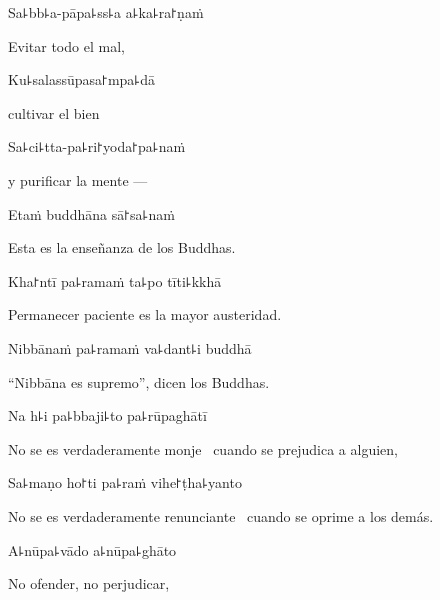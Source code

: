 
\enlargethispage{\baselineskip}

\begin{leader}
\end{leader}

Sa꜕bb꜕a-pāpa꜕ss꜕a a꜕ka꜕ra꜓ṇaṁ
	
	\begin{english}
		Evitar todo el mal,
	\end{english}
	
	Ku꜕salassūpasa꜓mpa꜕dā
	
	\begin{english}
		cultivar el bien
	\end{english}
	
	Sa꜕ci꜕tta-pa꜕ri꜓yoda꜓pa꜕naṁ
	
	\begin{english}
		y purificar la mente ---
	\end{english}
	
	Etaṁ buddhāna sā꜓sa꜕naṁ
	
	\begin{english}
		Esta es la enseñanza de los Buddhas.
	\end{english}


Kha꜓ntī pa꜕ramaṁ ta꜕po tīti꜕kkhā

\begin{english}
  Permanecer paciente es la mayor austeridad.
\end{english}

Nibbānaṁ pa꜕ramaṁ va꜕dant꜕i buddhā

\begin{english}
  “Nibbāna es supremo”, dicen los Buddhas.
\end{english}

Na h꜕i pa꜕bbaji꜕to pa꜕rūpaghātī

\begin{english}
  No se es verdaderamente monje \pause\ cuando se prejudica a alguien,
\end{english}

Sa꜕maṇo ho꜓ti pa꜕raṁ vihe꜓ṭha꜕yanto

\begin{english}
  No se es verdaderamente renunciante \pause\ cuando se oprime a los demás.
\end{english}

A꜕nūpa꜕vādo a꜕nūpa꜕ghāto

\begin{english}
  No ofender, no perjudicar,
\end{english}

